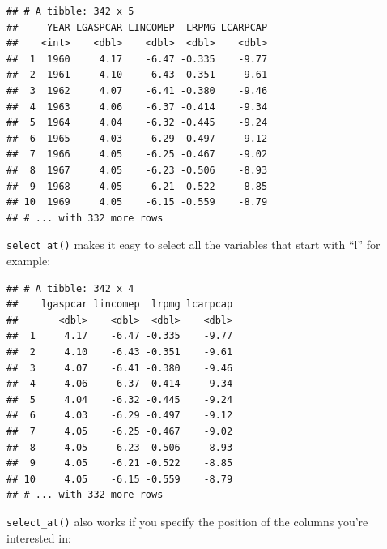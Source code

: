 \documentclass[]{gitbook}
\newenvironment{Shaded}{\begin{snugshade}}{\end{snugshade}}
\newcommand{\DecValTok}[1]{\textcolor[rgb]{0.00,0.00,0.81}{#1}}
\newcommand{\KeywordTok}[1]{\textcolor[rgb]{0.13,0.29,0.53}{\textbf{#1}}}
\newcommand{\NormalTok}[1]{#1}
\newcommand{\OperatorTok}[1]{\textcolor[rgb]{0.81,0.36,0.00}{\textbf{#1}}}
\newcommand{\StringTok}[1]{\textcolor[rgb]{0.31,0.60,0.02}{#1}}
\begin{document}
\begin{Shaded}
\end{Shaded}

\begin{verbatim}
## # A tibble: 342 x 5
##     YEAR LGASPCAR LINCOMEP  LRPMG LCARPCAP
##    <int>    <dbl>    <dbl>  <dbl>    <dbl>
##  1  1960     4.17    -6.47 -0.335    -9.77
##  2  1961     4.10    -6.43 -0.351    -9.61
##  3  1962     4.07    -6.41 -0.380    -9.46
##  4  1963     4.06    -6.37 -0.414    -9.34
##  5  1964     4.04    -6.32 -0.445    -9.24
##  6  1965     4.03    -6.29 -0.497    -9.12
##  7  1966     4.05    -6.25 -0.467    -9.02
##  8  1967     4.05    -6.23 -0.506    -8.93
##  9  1968     4.05    -6.21 -0.522    -8.85
## 10  1969     4.05    -6.15 -0.559    -8.79
## # ... with 332 more rows
\end{verbatim}

\texttt{select\_at()} makes it easy to select all the variables that start with ``l'' for example:

\begin{Shaded}
\end{Shaded}

\begin{verbatim}
## # A tibble: 342 x 4
##    lgaspcar lincomep  lrpmg lcarpcap
##       <dbl>    <dbl>  <dbl>    <dbl>
##  1     4.17    -6.47 -0.335    -9.77
##  2     4.10    -6.43 -0.351    -9.61
##  3     4.07    -6.41 -0.380    -9.46
##  4     4.06    -6.37 -0.414    -9.34
##  5     4.04    -6.32 -0.445    -9.24
##  6     4.03    -6.29 -0.497    -9.12
##  7     4.05    -6.25 -0.467    -9.02
##  8     4.05    -6.23 -0.506    -8.93
##  9     4.05    -6.21 -0.522    -8.85
## 10     4.05    -6.15 -0.559    -8.79
## # ... with 332 more rows
\end{verbatim}

\texttt{select\_at()} also works if you specify the position of the columns you're interested in:

\begin{Shaded}
\end{Shaded}
\end{document}
